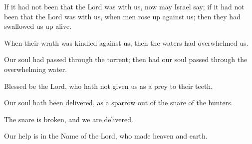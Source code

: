 If it had not been that the Lord was with us, now may Israel say; if it had not been that the Lord was with us, when men rose up against us; then they had swallowed us up alive.

When their wrath was kindled against us, then the waters had overwhelmed us.

Our soul had passed through the torrent; then had our soul passed through the overwhelming water.

Blessed be the Lord, who hath not given us as a prey to their teeth.

Our soul hath been delivered, as a sparrow out of the snare of the hunters.

The snare is broken, and we are delivered.

Our help is in the Name of the Lord, who made heaven and earth.
